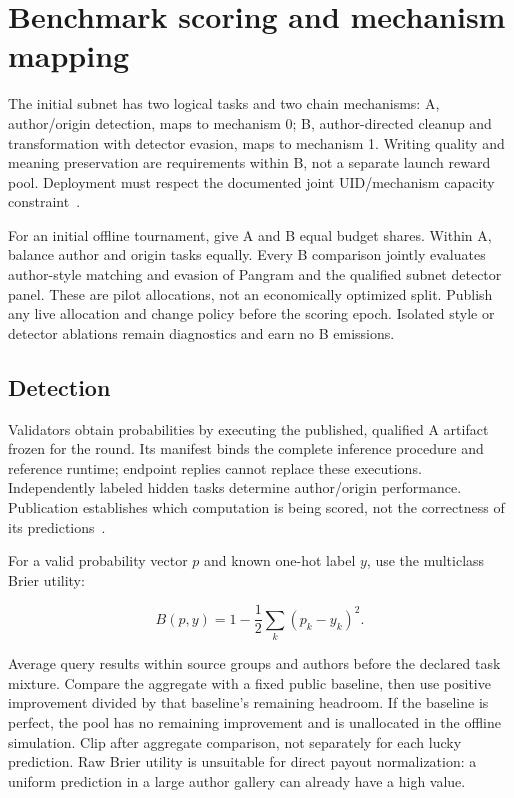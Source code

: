 \section{Benchmark scoring and mechanism
mapping}\label{benchmark-scoring-and-mechanism-mapping}

The initial subnet has two logical tasks and two chain mechanisms:
A, author/origin detection, maps to mechanism 0; B, author-directed
cleanup and transformation with detector evasion, maps to
mechanism 1. Writing quality and meaning preservation are requirements within B, not a
separate launch reward pool. Deployment must respect the documented
joint UID/mechanism capacity constraint~\cite{mechanisms}.

For an initial offline tournament, give A and B equal budget shares.
Within A, balance author and origin tasks equally. Every B comparison
jointly evaluates author-style matching and evasion of Pangram and the
qualified subnet detector panel. These are pilot
allocations, not an economically optimized split. Publish any live
allocation and change policy before the scoring epoch.
Isolated style or detector ablations remain diagnostics and earn no B emissions.

\subsection{Detection}\label{detection}

Validators obtain probabilities by executing the published, qualified A
artifact frozen for the round. Its manifest binds the complete inference
procedure and reference runtime; endpoint replies cannot replace these
executions. Independently labeled hidden tasks determine author/origin
performance. Publication establishes which computation is being scored,
not the correctness of its predictions~\cite{publicmodelevaluation}.

For a valid probability vector \(p\) and known one-hot label
\(y\), use the multiclass Brier utility:

\begin{equation}\label{eq:brier-utility}
  B(p,y)=1-\frac{1}{2}\sum_k(p_k-y_k)^2.
\end{equation}

Average query results within source groups and authors before the
declared task mixture. Compare the aggregate with a fixed public
baseline, then use positive improvement divided by that baseline's
remaining headroom. If the baseline is perfect, the pool has no
remaining improvement and is unallocated in the offline simulation. Clip
after aggregate comparison, not separately for each lucky prediction.
Raw Brier utility is unsuitable for direct payout normalization: a
uniform prediction in a large author gallery can already have a high
value.

